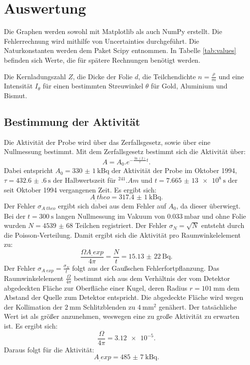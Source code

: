 \section{Auswertung}
\label{sec:Auswertung}

Die Graphen werden sowohl mit Matplotlib \cite{matplotlib} als auch NumPy \cite{numpy} erstellt. Die Fehlerrechnung wird mithilfe von Uncertainties \cite{uncertainties} durchgeführt. Die Naturkonstanten werden dem Paket Scipy \cite{scipy} entnommen.
In Tabelle \ref{tab:values} befinden sich Werte, die für spätere Rechnungen benötigt werden.

\begin{table}
	\centering
	\caption{Die Kernladungszahl $Z$, die Dicke der Folie $d$, die Teilchendichte $n=\frac{\rho}{m}$ und eine Intensität $I_\theta$ für einen bestimmten Streuwinkel $\theta$ für Gold, Aluminium und Bismut.}
	
	\label{tab:values}
\end{table}

\subsection{Bestimmung der Aktivität}

Die Aktivität der Probe wird über das Zerfallsgesetz, sowie über eine Nullmessung bestimmt.
Mit dem Zerfallsgesetz bestimmt sich die Aktivität über: 
\[
A = A_0 .e^{-\frac{\ln(2)}{\tau}t}\text{.}
\]
Dabei entspricht $A_0 = \SI{330(1)}{\kilo\becquerel}$ der Aktivität der Probe im Oktober 1994, $\tau = \SI{432.6(6)}{\second}$ der Halbwertszeit für $^{241}.{Am}$ und $t = \SI{7,665(13)e8}{\second}$ der seit Oktober 1994 vergangenen Zeit. Es ergibt sich:
\[
A_.{theo} = \SI{317.4(10)}{\kilo\becquerel} \text{.}
\]
Der Fehler $\sigma_{A_.{theo}}$ ergibt sich dabei aus dem Fehler auf $A_0$, da dieser überwiegt.
Bei der $t = \SI{300}{\second}$ langen Nullmessung im Vakuum von $\SI{0,033}{\milli\bar}$ und ohne Folie wurden $N = \num{4539(68)}$ Teilchen registriert. Der Fehler $\sigma_N=\sqrt{N}$ entsteht durch die Poisson-Verteilung. 
Damit ergibt sich die Aktivität pro Raumwinkelelement zu:
\[
\frac{\Omega A_.{exp}}{4\pi} = \frac{N}{t} = \SI{15,13(22)}{\becquerel} \text{.}
\] 
Der Fehler $\sigma_{A_.{exp}}=\frac{\sigma_N}{t}$ folgt aus der Gaußschen Fehlerfortpflanzung. 
Das Raumwinkelelement $\frac{\Omega}{4\pi}$ bestimmt sich aus dem Verhältnis der vom Detektor abgedeckten Fläche zur Oberfläche einer Kugel, deren Radius $r = \SI{101}{\milli\metre}$ \cite{V16} dem Abstand der Quelle zum Detektor entspricht. Die abgedeckte Fläche wird wegen der Kollimation der $\SI{2}{\milli\metre}$ Schlitzblenden zu $\SI{4}{\milli\metre\squared}$ genähert. Der tatsächliche Wert ist als größer anzunehmen, weswegen eine zu große Aktivität zu erwarten ist. Es ergibt sich:
\[
\frac{\Omega}{4\pi} = \num{3,12e-5}\text{.}
\]   
Daraus folgt für die Aktivität:
\[
A_.{exp} = \SI{485(7)}{\kilo\becquerel} \text{.}
\]

